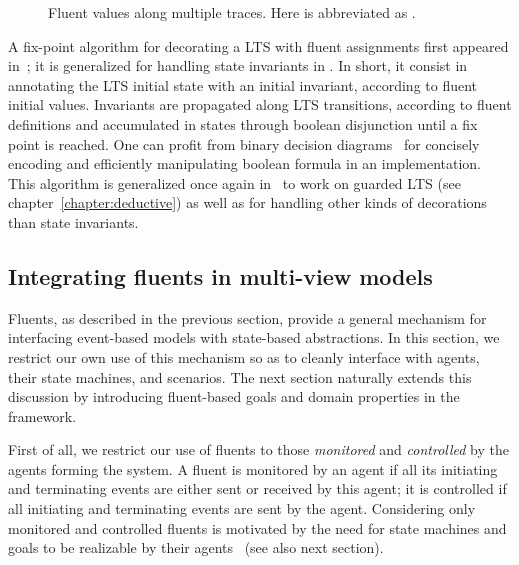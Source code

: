 \begin{figure}[H]\centering
{}
\caption{Fluent values along multiple traces. Here  is abbreviated as .\label{image:fluent-values-along-multiple-traces}}
\end{figure}

A fix-point algorithm for decorating a LTS with fluent assignments first appeared in~\cite{Damas:2005}; it is generalized for handling state invariants in \cite{Damas:2009}. In short, it consist in annotating the LTS initial state with an initial invariant, according to fluent initial values. Invariants are propagated along LTS transitions, according to fluent definitions and accumulated in states through boolean disjunction until a fix point is reached. One can profit from binary decision diagrams~\cite{Bryant:1986} for concisely encoding and efficiently manipulating boolean formula in an implementation. This algorithm is generalized once again in~\cite{Damas:2011} to work on guarded LTS (see chapter~\ref{chapter:deductive}) as well as for handling other kinds of decorations than state invariants.

\subsection{Integrating fluents in multi-view models}

Fluents, as described in the previous section, provide a general mechanism for interfacing event-based models with state-based abstractions. In this section, we restrict our own use of this mechanism so as to cleanly interface with agents, their state machines, and scenarios. The next section naturally extends this discussion by introducing fluent-based goals and domain properties in the framework.

First of all, we restrict our use of fluents to those \emph{monitored} and \emph{controlled} by the agents forming the system. A fluent is monitored by an agent if all its initiating and terminating events are either sent or received by this agent; it is controlled if all initiating and terminating events are sent by the agent. Considering only monitored and controlled fluents is motivated by the need for state machines and goals to be realizable by their agents~\cite{Letier:2002} (see also next section).

